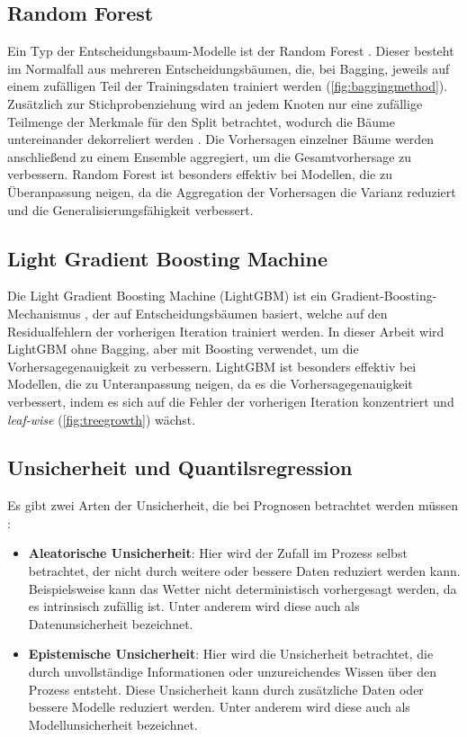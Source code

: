 \subsection{Random Forest}
\label{sec:randomforest}

Ein Typ der Entscheidungsbaum-Modelle ist der Random Forest \parencite{breiman2001random}. Dieser besteht im Normalfall aus mehreren Entscheidungsbäumen, die, bei Bagging, jeweils auf einem zufälligen Teil der Trainingsdaten trainiert werden (\cref{fig:baggingmethod}). Zusätzlich zur Stichprobenziehung wird an jedem Knoten nur eine zufällige Teilmenge der Merkmale für den Split betrachtet, wodurch die Bäume untereinander dekorreliert werden \parencite{breiman2001random}. Die Vorhersagen einzelner Bäume werden anschließend zu einem Ensemble aggregiert, um die Gesamtvorhersage zu verbessern. Random Forest ist besonders effektiv bei Modellen, die zu Überanpassung neigen, da die Aggregation der Vorhersagen die Varianz reduziert und die Generalisierungsfähigkeit verbessert. 



\subsection{Light Gradient Boosting Machine}
\label{sec:lightgbm}

Die Light Gradient Boosting Machine (LightGBM) \parencite{ke2017lightgbm} ist ein Gradient-Boosting-\\Mechanismus \parencite{friedman2001greedy}, der auf Entscheidungsbäumen basiert, welche auf den Residualfehlern der vorherigen Iteration trainiert werden. In dieser Arbeit wird LightGBM ohne Bagging, aber mit Boosting verwendet, um die Vorhersagegenauigkeit zu verbessern. LightGBM ist besonders effektiv bei Modellen, die zu Unteranpassung neigen, da es die Vorhersagegenauigkeit verbessert, indem es sich auf die Fehler der vorherigen Iteration konzentriert und \emph{leaf-wise} (\cref{fig:treegrowth}) wächst.

\subsection{Unsicherheit und Quantilsregression}
\label{sec:quantilregression}

Es gibt zwei Arten der Unsicherheit, die bei Prognosen betrachtet werden müssen \parencite{huellermeier2021aleatoric,kendall2017uncertainties}:
\begin{itemize}
  \item \textbf{Aleatorische Unsicherheit}: Hier wird der Zufall im Prozess selbst betrachtet, der nicht durch weitere oder bessere Daten reduziert werden kann. Beispielsweise kann das Wetter nicht deterministisch vorhergesagt werden, da es intrinsisch zufällig ist. Unter anderem wird diese auch als Datenunsicherheit bezeichnet.
  \item \textbf{Epistemische Unsicherheit}: Hier wird die Unsicherheit betrachtet, die durch unvollständige Informationen oder unzureichendes Wissen über den Prozess entsteht. Diese Unsicherheit kann durch zusätzliche Daten oder bessere Modelle reduziert werden. Unter anderem wird diese auch als Modellunsicherheit bezeichnet.
\end{itemize}

